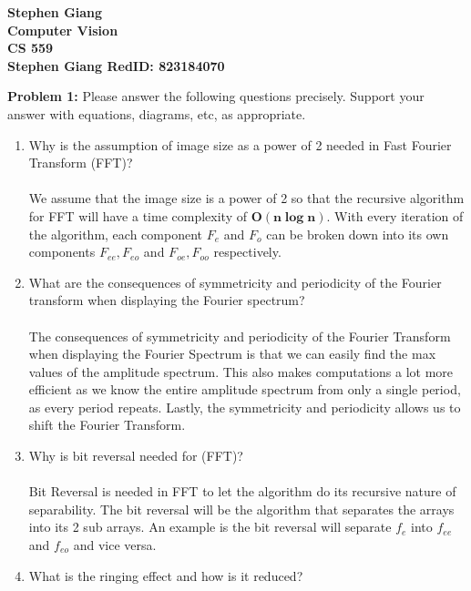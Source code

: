 \documentclass[11pt]{article}
\newcommand{\skipline}{\vspace{\baselineskip}}
\newenvironment{problem}[1]{\textbf{Problem #1: }}{\newpage}
\begin{document}
	
	\begin{center}
		\textbf{Stephen Giang} \\
		\textbf{Computer Vision} \\
		\textbf{CS 559} \\
		\textbf{Stephen Giang RedID: 823184070} \\
		\skipline \skipline
	\end{center}

	\begin{problem}{1}
		Please answer the following questions precisely. Support your answer with equations, diagrams, etc, as appropriate.
		\begin{enumerate}[label = (\alph*)]
			\item Why is the assumption of image size as a power of 2 needed in Fast Fourier Transform (FFT)?
			\\ \\
			We assume that the image size is a power of 2 so that the recursive algorithm for FFT will have a time complexity of $\boldsymbol{O(n\log n )}$.  With every iteration of the algorithm, each component $F_e$ and $F_o$ can be broken down into its own components $F_{ee}, F_{eo}$ and $F_{oe}, F_{oo}$ respectively.
			\\
			\item What are the consequences of symmetricity and periodicity of the Fourier transform when displaying the Fourier spectrum? 
			\\ \\
			The consequences of symmetricity and periodicity of the Fourier Transform when displaying the Fourier Spectrum is that we can easily find the max values of the amplitude spectrum.  This also makes computations a lot more efficient as we know the entire amplitude spectrum from only a single period, as every period repeats. Lastly, the symmetricity and periodicity allows us to shift the Fourier Transform.
			\\
			\item Why is bit reversal needed for (FFT)?
			\\ \\
			Bit Reversal is needed in FFT to let the algorithm do its recursive nature of separability.  The bit reversal will be the algorithm that separates the arrays into its 2 sub arrays.  An example is the bit reversal will separate $f_e$ into $f_{ee}$ and $f_{eo}$ and vice versa.  
			\\
			\item What is the ringing effect and how is it reduced?

\end{enumerate}
\end{problem}
\end{document}
